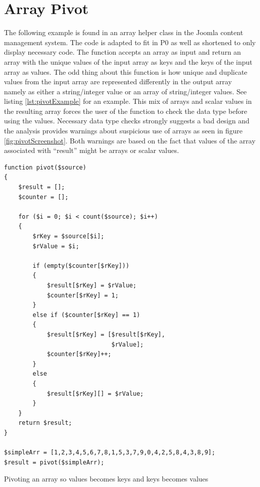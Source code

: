 \section{Array Pivot}
The following example is found in an array helper class in the Joomla content management system. The code is adapted to fit in P0 as well as shortened to only display necessary code. The function accepts an array as input and return an array with the unique values of the input array as keys and the keys of the input array as values. The odd thing about this function is how unique and duplicate values from the input array are represented differently in the output array namely as either a string/integer value or an array of string/integer values. See listing \ref{lst:pivotExample} for an example. This mix of arrays and scalar values in the resulting array forces the user of the function to check the data type before using the values. Necessary data type checks strongly suggests a bad design and the analysis provides warnings about suspicious use of arrays as seen in figure \ref{fig:pivotScreenshot}. Both warnings are based on the fact that values of the array associated with ``result'' might be arrays or scalar values.


\begin{program}
\begin{lstlisting}
function pivot($source)
{
    $result = [];
    $counter = [];

    for ($i = 0; $i < count($source); $i++)
    {
        $rKey = $source[$i];
        $rValue = $i;

        if (empty($counter[$rKey]))
        {
            $result[$rKey] = $rValue;
            $counter[$rKey] = 1;
        }
        else if ($counter[$rKey] == 1)
        {
            $result[$rKey] = [$result[$rKey],
                              $rValue];
            $counter[$rKey]++;
        }
        else
        {
            $result[$rKey][] = $rValue;
        }
    }
    return $result;
}

$simpleArr = [1,2,3,4,5,6,7,8,1,5,3,7,9,0,4,2,5,8,4,3,8,9];
$result = pivot($simpleArr);
\end{lstlisting}
\caption{Pivoting an array so values becomes keys and keys becomes values}
\label{lst:pivot}
\end{program}

